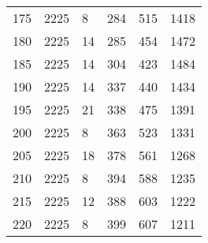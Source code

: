 \begin{longtable}{|l|l|l|l|l|l|}
175 & 2225 & 8 & 284 & 515 & 1418 \\
180 & 2225 & 14 & 285 & 454 & 1472 \\
185 & 2225 & 14 & 304 & 423 & 1484 \\
190 & 2225 & 14 & 337 & 440 & 1434 \\
195 & 2225 & 21 & 338 & 475 & 1391 \\
200 & 2225 & 8 & 363 & 523 & 1331 \\
205 & 2225 & 18 & 378 & 561 & 1268 \\
210 & 2225 & 8 & 394 & 588 & 1235 \\
215 & 2225 & 12 & 388 & 603 & 1222 \\
220 & 2225 & 8 & 399 & 607 & 1211 \\

	
	\bottomrule
\end{longtable}




